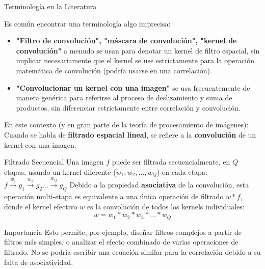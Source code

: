 \documentclass[10pt]{beamer}
\newcommand{\eqnum}[1]{\tag{#1}} %
\begin{document}
\begin{frame}{Terminología en la Literatura}
{\footnotesize
Es común encontrar una terminología algo imprecisa:
\begin{itemize}
\item \textbf{"Filtro de convolución", "máscara de convolución", "kernel de convolución"} a menudo se usan para denotar un kernel de filtro espacial, sin implicar necesariamente que el kernel se use estrictamente para la operación matemática de convolución (podría usarse en una correlación).
\item \textbf{"Convolucionar un kernel con una imagen"} se usa frecuentemente de manera genérica para referirse al proceso de deslizamiento y suma de productos, sin diferenciar estrictamente entre correlación y convolución.
\end{itemize}
\begin{alertblock}{En este contexto (y en gran parte de la teoría de procesamiento de imágenes):}
Cuando se habla de \textbf{filtrado espacial lineal}, se refiere a la \textbf{convolución} de un kernel con una imagen.
\end{alertblock}
}
\end{frame}

\begin{frame}[fragile]{Filtrado Secuencial}
Una imagen $f$ puede ser filtrada secuencialmente, en $Q$ etapas, usando un kernel diferente ($w_1, w_2, \dots, w_Q$) en cada etapa:
$f \xrightarrow{w_1} g_1 \xrightarrow{w_2} g_2 \dots \xrightarrow{w_Q} g_Q$
\vspace{0.1cm}
Debido a la propiedad \textbf{asociativa} de la convolución, esta operación multi-etapa es equivalente a una única operación de filtrado $w*f$, donde el kernel efectivo $w$ es la convolución de todos los kernels individuales:
\begin{equation}
w = w_1 * w_2 * w_3 * \dots * w_Q \eqnum{3-38}
\end{equation}
\vspace{0.1cm}
\begin{exampleblock}{\footnotesize Importancia}
{\footnotesize Esto permite, por ejemplo, diseñar filtros complejos a partir de filtros más simples, o analizar el efecto combinado de varias operaciones de filtrado. No se podría escribir una ecuación similar para la correlación debido a su falta de asociatividad.}
\end{exampleblock}
\end{frame}
\end{document}
